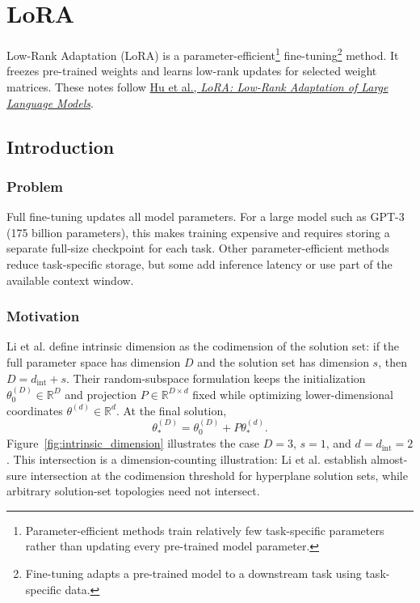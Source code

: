 \section{LoRA}

Low-Rank Adaptation (LoRA) is a parameter-efficient\footnote{Parameter-efficient methods train relatively few task-specific parameters rather than updating every pre-trained model parameter.} fine-tuning\footnote{Fine-tuning adapts a pre-trained model to a downstream task using task-specific data.} method. It freezes pre-trained weights and learns low-rank updates for selected weight matrices. These notes follow \href{https://arxiv.org/abs/2106.09685}{Hu et al., \emph{LoRA: Low-Rank Adaptation of Large Language Models}}.

\subsection{Introduction}

\subsubsection{Problem}

Full fine-tuning updates all model parameters. For a large model such as GPT-3 (175 billion parameters), this makes training expensive and requires storing a separate full-size checkpoint for each task. Other parameter-efficient methods reduce task-specific storage, but some add inference latency or use part of the available context window.

\subsubsection{Motivation}

Li et al. define intrinsic dimension as the codimension of the solution set: if the full parameter space has dimension $D$ and the solution set has dimension $s$, then $D=d_{\mathrm{int}}+s$. Their random-subspace formulation keeps the initialization $\theta_0^{(D)}\in\mathbb R^D$ and projection $P\in\mathbb R^{D\times d}$ fixed while optimizing lower-dimensional coordinates $\theta^{(d)}\in\mathbb R^d$. At the final solution,
\[
	\boxed{\theta_*^{(D)}=\theta_0^{(D)}+P\theta_*^{(d)}}.
\]
Figure~\ref{fig:intrinsic_dimension} illustrates the case $D=3$, $s=1$, and $d=d_{\mathrm{int}}=2$. This intersection is a dimension-counting illustration: Li et al. establish almost-sure intersection at the codimension threshold for hyperplane solution sets, while arbitrary solution-set topologies need not intersect.

